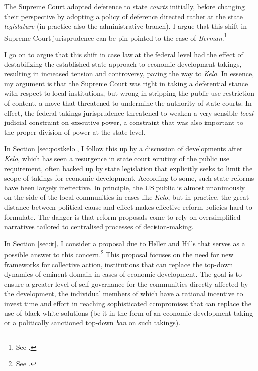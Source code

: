 {The Supreme Court adopted deference to state {\it courts} initially, before changing their perspective by adopting a policy of deference directed rather at the state {\it legislature} (in practice also the administrative branch). I argue that this shift in Supreme Court jurisprudence can be pin-pointed to the case of {\it Berman}.\footnote{See \cite{berman54}.}

I go on to argue that this shift in case law at the federal level had the effect of destabilizing the established state approach to economic development takings, resulting in increased tension and controversy, paving the way to {\it Kelo}. In essence, my argument is that the Supreme Court was right in taking a deferential stance with respect to local institutions, but wrong in stripping the public use restriction of content, a move that threatened to undermine the authority of state courts. In effect, the federal takings jurisprudence threatened to weaken a very sensible {\it local} judicial constraint on executive power, a constraint that was also important to the proper division of power at the state level.

In Section \ref{sec:postkelo}, I follow this up by a discussion of developments after {\it Kelo}, which has seen a resurgence in state court scrutiny of the public use requirement, often backed up by state legislation that explicitly seeks to limit the scope of takings for economic development. According to some, such state reforms have been largely ineffective. %
In principle, the US public is almost unanimously on the side of the local communities in cases like {\it Kelo}, but in practice, the great distance between political cause and effect makes effective reform policies hard to formulate. The danger is that reform proposals come to rely on oversimplified narratives tailored to centralised processes of decision-making.

In Section \ref{sec:ir}, I consider a proposal due to Heller and Hills that serves as a possible answer to this concern.\footnote{See \cite{heller08}.} This proposal focuses on the need for new frameworks for collective action, institutions that can replace the top-down dynamics of eminent domain in cases of economic development. The goal is to ensure a greater level of self-governance for the communities directly affected by the development, the individual members of which have a rational incentive to invest time and effort in reaching sophisticated compromises that can replace the use of black-white solutions (be it in the form of an economic development taking or a politically sanctioned top-down {\it ban} on such takings).

}
